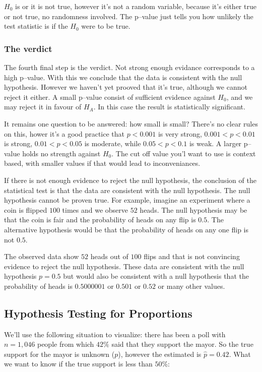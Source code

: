 $H_0$ is or it is not true, however it's not a random variable, because it's
either true or not true, no randomness involved. The p--value just tells you how
unlikely the test statistic is if the $H_0$ were to be true.

\subsubsection{The verdict}

The fourth final step is the verdict. Not strong enough evidance corresponds to
a high p--value. With this we conclude that the data is consistent with the null
hypothesis. However we haven't yet prooved that it's true, although we cannot
reject it either. A small p--value consist of sufficient evidence against $H_0$,
and we may reject it in favour of $H_A$. In this case the result is
statistically significant.

It remains one question to be answered: how small is small? There's no clear
rules on this, hower it's a good practice that $p<0.001$ is very strong, $0.001
< p < 0.01$ is strong, $0.01 < p < 0.05$ is moderate, while $0.05 < p < 0.1$ is
weak. A larger p--value holds no strength against $H_0$. The cut off value you'l
want to use is context based, with smaller values if that would lead to
inconveniances.

If there is not enough evidence to reject the null hypothesis, the conclusion of
the statistical test is that the data are consistent with the null hypothesis.
The null hypothesis cannot be proven true. For example, imagine an experiment
where a coin is flipped $100$ times and we observe $52$ heads. The null
hypothesis may be that the coin is fair and the probability of heads on any flip
is $0.5$.
The alternative hypothesis would be that the probability of heads on any one
flip is not $0.5$.

The observed data show $52$ heads out of $100$ flips and that is not convincing
evidence to reject the null hypothesis. These data are consistent with the null
hypothesis $p=0.5$ but would also be consistent with a null hypothesis that the
probability of heads is $0.5000001$ or $0.501$ or $0.52$ or many other values.

\subsection{Hypothesis Testing for Proportions}

We'll use the following situation to visualize: there has been a poll with
$n=1,046$ people from which $42\%$ said that they support the mayor. So the true
support for the mayor is unknown ($p$), however the estimated is $\hat{p}=0.42$.
What we want to know if the true support is less than $50\%$:

